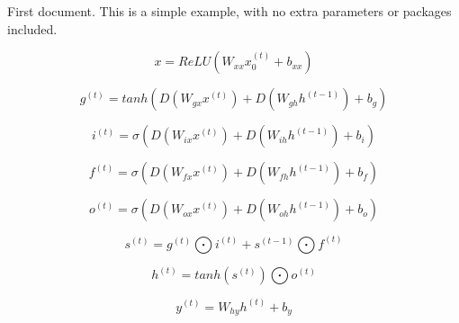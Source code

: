 \documentclass{article}
\begin{document}
First document. This is a simple example, with no
extra parameters or packages included.

\begin{displaymath}
    x=ReLU(W_{xx}x^{(t)}_0+b_{xx})
\end{displaymath}

\begin{displaymath}   
g^{(t)}=tanh(D(W_{gx}x^{(t)})+D(W_{gh}h^{(t-1)})+b_g)
\end{displaymath}

\begin{displaymath}
i^{(t)}=\sigma (D(W_{ix}x^{(t)})+D(W_{ih}h^{(t-1)})+b_i)
\end{displaymath}

\begin{displaymath}
f^{(t)}=\sigma (D(W_{fx}x^{(t)})+D(W_{fh}h^{(t-1)})+b_f)
\end{displaymath}

\begin{displaymath}
o^{(t)}=\sigma (D(W_{ox}x^{(t)})+D(W_{oh}h^{(t-1)})+b_o)
\end{displaymath}

\begin{displaymath}
s^{(t)}=g^{(t)}\bigodot i^{(t)}+s^{(t-1)}\bigodot f^{(t)}
\end{displaymath}

\begin{displaymath}
h^{(t)}=tanh(s^{(t)})\bigodot o^{(t)}
\end{displaymath}

\begin{displaymath}
y^{(t)}=W_{hy}h^{(t)}+b_y
\end{displaymath}
\end{document}
